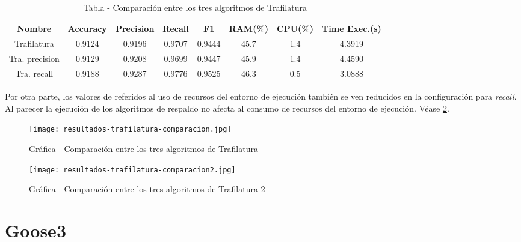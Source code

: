 \begin{table}[h]
    \begin{center}
      \begin{tabular}{| c | c | c | c | c | c | c | c |} \hline 
       \textbf{Nombre} & \textbf{Accuracy} & \textbf{Precision}  & \textbf{Recall} & \textbf{F1} & \textbf{RAM(\%)} & \textbf{CPU(\%)} & \textbf{Time Exec.(s)} \\ \hline
       Trafilatura & 0.9124 & 0.9196 & 0.9707 & 0.9444 & 45.7 & 1.4 & 4.3919 \\ \hline
       Tra. precision & 0.9129 & 0.9208 & 0.9699 & 0.9447 & 45.9 & 1.4 & 4.4590 \\ \hline
       Tra. recall & 0.9188 & 0.9287 & 0.9776 & 0.9525 & 46.3 & 0.5 & 3.0888 \\ \hline
      \end{tabular}
      \caption{Tabla - Comparación entre los tres algoritmos de Trafilatura}
      \label{tab:tabla - comparacion entre los tres algoritmos de trafilatura}
    \end{center}
\end{table}

Por otra parte, los valores de referidos al uso de recursos del entorno de ejecución también se ven
reducidos en la configuración para \emph{recall}. Al parecer la ejecución de los algoritmos de respaldo no
afecta al consumo de recursos del entorno de ejecución. Véase 
\ref{img:grafica - comparacion entre los tres algoritmos de trafilatura 2}.

\begin{figure}[tphb]
    \centering
    \texttt{[image: resultados-trafilatura-comparacion.jpg]}
    \caption{Gráfica - Comparación entre los tres algoritmos de Trafilatura}
    \label{img:grafica - comparacion entre los tres algoritmos de trafilatura}
\end{figure}

\begin{figure}[tphb]
    \centering
    \texttt{[image: resultados-trafilatura-comparacion2.jpg]}
    \caption{Gráfica - Comparación entre los tres algoritmos de Trafilatura 2}
    \label{img:grafica - comparacion entre los tres algoritmos de trafilatura 2}
\end{figure}

\section*{Goose3}




